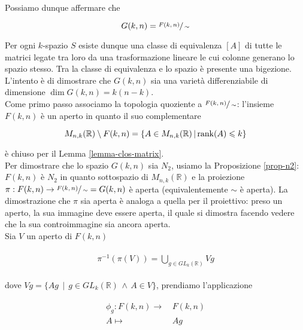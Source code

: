 Possiamo dunque affermare che

\begin{equation}
	G(k,n) = \sfrac{F(k,n)}{\sim}
\end{equation}

Per ogni $ k $-spazio $ S $ esiste dunque una classe di equivalenza $ [A] $ di tutte le matrici legate tra loro da una trasformazione lineare le cui colonne generano lo spazio stesso. Tra la classe di equivalenza e lo spazio è presente una bigezione.\\
L'intento è di dimostrare che $ G(k,n) $ sia una varietà differenziabile di dimensione $ \dim G(k,n) = k (n-k) $.\\
Come primo passo associamo la topologia quoziente a $ \sfrac{F(k,n)}{\sim} $: l'insieme $ F(k,n) $ è un aperto in quanto il suo complementare

\begin{equation}
	M_{n,k}(\mathbb{R}) \setminus F(k,n) = \left\{ A \in M_{n,k}(\mathbb{R}) \, \middle| \, \rank(A) \leqslant k \right\}
\end{equation}

è chiuso per il Lemma \ref{lemma-clos-matrix}.\\
Per dimostrare che lo spazio $ G(k,n) $ sia $ N_{2} $, usiamo la Proposizione \ref{prop-n2}: $ F(k,n) $ è $ N_{2} $ in quanto sottospazio di $ M_{n,k}(\mathbb{R}) $ e la proiezione $ \pi : F(k,n) \to \sfrac{F(k,n)}{\sim} = G(k,n) $ è aperta (equivalentemente $ \sim $ è aperta).
La dimostrazione che $ \pi $ sia aperta è analoga a quella per il proiettivo: preso un aperto, la sua immagine deve essere aperta, il quale si dimostra facendo vedere che la sua controimmagine sia ancora aperta.\\
Sia $ V $ un aperto di $ F(k,n) $

\begin{align}
	\begin{split}
		\pi^{-1}(\pi(V)) = \bigcup_{g \in GL_{k}(\mathbb{R})} V g
	\end{split}
\end{align}

dove $ V g = \{ A g \, \mid \, g \in GL_{k}(\mathbb{R}) \, \wedge \, A \in V \} $, prendiamo l'applicazione

\begin{align}
	\begin{split}
		\phi_{g} : F(k,n) \to& \, F(k,n)\\
		A \mapsto& \, A g
	\end{split}
\end{align}

